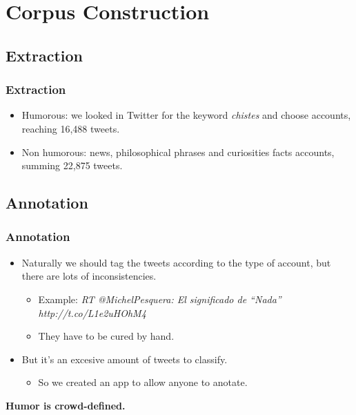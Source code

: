 \section{Corpus Construction}

\subsection{Extraction}
\begin{frame}
    \frametitle{Extraction}

    \begin{itemize}
        \item Humorous: we looked in Twitter for the keyword \emph{chistes} and choose accounts, reaching 16,488 tweets.
        \item Non humorous: news, philosophical phrases and curiosities facts accounts, summing 22,875 tweets.
    \end{itemize}
\end{frame}

\subsection{Annotation}
\begin{frame}
    \frametitle{Annotation}

    \begin{itemize}
        \item Naturally we should tag the tweets according to the type of account, but there are lots of inconsistencies.

        \begin{itemize}
            \item Example: \emph{RT @MichelPesquera: El significado de ``Nada'' http://t.co/L1e2uHOhM4}

            \item They have to be cured by hand.
        \end{itemize}

        \item But it's an excesive amount of tweets to classify.

        \begin{itemize}
            \item So we created an app to allow anyone to anotate.
        \end{itemize}
    \end{itemize}

    \vspace{1cm}

    \begin{center}
        \bf
        Humor is crowd-defined.
    \end{center}
\end{frame}

